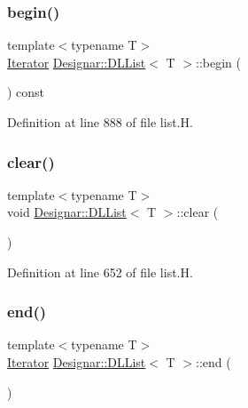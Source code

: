 \subsubsection{\texorpdfstring{begin()}{begin()}\hspace{0.1cm}{\footnotesize\ttfamily [2/2]}}
{\footnotesize\ttfamily template$<$typename T$>$ \\
\hyperlink{class_designar_1_1_d_l_list_1_1_iterator}{Iterator} \hyperlink{class_designar_1_1_d_l_list}{Designar\+::\+D\+L\+List}$<$ T $>$\+::begin (\begin{DoxyParamCaption}{ }\end{DoxyParamCaption}) const\hspace{0.3cm}{\ttfamily [inline]}}



Definition at line 888 of file list.\+H.

\mbox{\label{class_designar_1_1_d_l_list_a0b617ee4b2f03b58b74630f79566f1b8}} 
\subsubsection{\texorpdfstring{clear()}{clear()}}
{\footnotesize\ttfamily template$<$typename T$>$ \\
void \hyperlink{class_designar_1_1_d_l_list}{Designar\+::\+D\+L\+List}$<$ T $>$\+::clear (\begin{DoxyParamCaption}{ }\end{DoxyParamCaption})\hspace{0.3cm}{\ttfamily [inline]}}



Definition at line 652 of file list.\+H.

\mbox{\label{class_designar_1_1_d_l_list_afa49470cd57bc800bfa95c00cebb4c08}} 
\subsubsection{\texorpdfstring{end()}{end()}\hspace{0.1cm}{\footnotesize\ttfamily [1/2]}}
{\footnotesize\ttfamily template$<$typename T$>$ \\
\hyperlink{class_designar_1_1_d_l_list_1_1_iterator}{Iterator} \hyperlink{class_designar_1_1_d_l_list}{Designar\+::\+D\+L\+List}$<$ T $>$\+::end (\begin{DoxyParamCaption}{ }\end{DoxyParamCaption})\hspace{0.3cm}{\ttfamily [inline]}}



